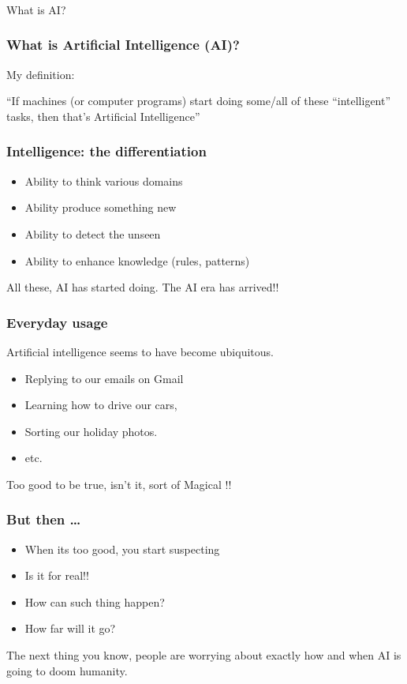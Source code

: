 \begin{frame}[fragile]\frametitle{}
\begin{center}
{\Large What is AI?}
\end{center}
\end{frame}



\begin{frame}[fragile]\frametitle{ What is Artificial Intelligence (AI)?}
My definition:


``If machines (or computer programs) start doing some/all of these ``intelligent'' tasks, then that's Artificial Intelligence''

\end{frame}

\begin{frame}[fragile]\frametitle{ Intelligence: the differentiation}
\begin{itemize}
\item Ability to think various domains
\item Ability produce something new
\item Ability to detect the unseen
\item Ability to enhance knowledge (rules, patterns)
\end{itemize}
All these, AI has started doing. The AI era has arrived!!
\end{frame}



\begin{frame}[fragile]\frametitle{Everyday usage}
Artificial intelligence seems to have become ubiquitous.
\begin{itemize}
\item Replying to our emails on Gmail
\item Learning how to drive our cars,
\item Sorting our holiday photos.
\item etc.
\end{itemize}
Too good to be true, isn't it, sort of Magical !!
\end{frame}

\begin{frame}[fragile]\frametitle{But then \ldots}
\begin{itemize}
\item When its too good, you start suspecting
\item Is it for real!!
\item How can such thing happen?
\item How far will it go?
\end{itemize}
The next thing you know, people are worrying about exactly how and when AI is going to doom humanity.
\end{frame}


